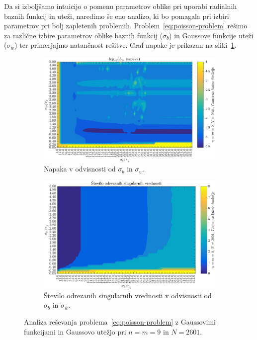 \documentclass[12pt,a4paper,twoside]{article}
\theoremstyle{definition} %
\theoremstyle{plain} %
\numberwithin{equation}{section}
\begin{document}
Da si izboljšamo intuicijo o pomenu parametrov oblike pri uporabi radialnih
baznih funkcij in uteži, naredimo še eno analizo, ki bo pomagala pri izbiri
parametrov pri bolj zapletenih problemih. Problem~\eqref{eq:poisson-problem}
rešimo za različne izbire parametrov oblike baznih funkcij ($\sigma_b$) in
Gaussove funkcije uteži ($\sigma_w$) ter primerjajmo natančnost rešitve.
Graf napake je prikazan na sliki~\ref{fig:poisson-square-sigma-dep-error}.
\begin{figure}[h]
  \centering
  \begin{subfigure}[t]{0.48\textwidth}
    \includegraphics[width=\textwidth]{images/poisson_square_sigma_depedence_error.png}
    \caption{Napaka v odvisnosti od $\sigma_b$ in $\sigma_w$.}
    \label{fig:poisson-square-sigma-dep-error}
  \end{subfigure}
  \begin{subfigure}[t]{0.48\textwidth}
    \includegraphics[width=\textwidth]{images/poisson_square_sigma_depedence_cutoff.png}
    \caption[Število odrezanih singularnih vrednosti.]{Število odrezanih
    singularnih vrednosti v odvisnosti od $\sigma_b$ in $\sigma_w$.}
    \label{fig:poisson-square-sigma-dep-cutoff}
  \end{subfigure}
  \caption[Reševanja Poissonove enačbe z Gaussovimi funkcijami in utežjo.]{Analiza reševanja
  problema~\eqref{eq:poisson-problem} z Gaussovimi funkcijami in Gaussovo utežjo pri $n = m = 9$ in
  $N = 2601$.}
  \label{fig:poisson-square-sigma-dep}
\end{figure}
\end{document}
